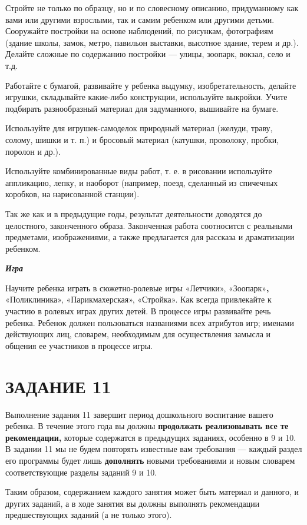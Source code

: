 \documentclass{book}
\renewcommand{\emph}[1]{\textit{#1}}
\begin{document}
Стройте не только по образцу, но и по словесному описанию, придуманному
как вами или другими взрослыми, так и самим ребенком или другими детьми.
Сооружайте постройки на основе наблюдений, по рисункам, фотографиям
(здание школы, замок, метро, павильон выставки, высотное здание, терем и
др.). Делайте сложные по содержанию постройки --- улицы, зоопарк,
вокзал, село и т.д.

Работайте с бумагой, развивайте у ребенка выдумку, изобретательность,
делайте игрушки, складывайте какие-либо конструкции, используйте
выкройки. Учите подбирать разнообразный материал для задуманного,
вышивайте на бумаге.

Используйте для игрушек-самоделок природный материал (желуди, траву,
солому, шишки и т. п.) и бросовый материал (катушки, проволоку, пробки,
поролон и др.).

Используйте комбинированные виды работ, т. е. в рисовании используйте
аппликацию, лепку, и наоборот (например, поезд, сделанный из спичечных
коробков, на нарисованной станции).

Так же как и в предыдущие годы, результат деятельности доводятся до
целостного, законченного образа. Законченная работа соотносится с
реальными предметами, изображениями, а также предлагается для рассказа и
драматизации ребенком.

\emph{\textbf{Игра}}

Научите ребенка играть в сюжетно-ролевые игры «Летчики»,
«Зоопарк»\textbf{,} «Поликлиника», «Парикмахерская», «Стройка». Как
всегда привлекайте к участию в ролевых играх других детей. В процессе
игры развивайте речь ребенка. Ребенок должен пользоваться названиями
всех атрибутов игр; именами действующих лиц, словарем, необходимым для
осуществления замысла и общения ее участников в процессе игры.

\section{ЗАДАНИЕ 11}

Выполнение задания 11 завершит период дошкольного воспитание вашего
ребенка. В течение этого года вы должны \textbf{продолжать реализовывать
все те рекомендации,} которые содержатся в предыдущих заданиях, особенно
в 9 и 10. В задании 11 мы не будем повторять известные вам требования
--- каждый раздел его программы будет лишь \textbf{дополнять} новыми
требованиями и новым словарем соответствующие разделы заданий 9 и 10.

Таким образом, содержанием каждого занятия может быть материал и
данного, и других заданий, а в ходе занятия вы должны выполнять
рекомендации предшествующих заданий (а не только этого).
\end{document}
